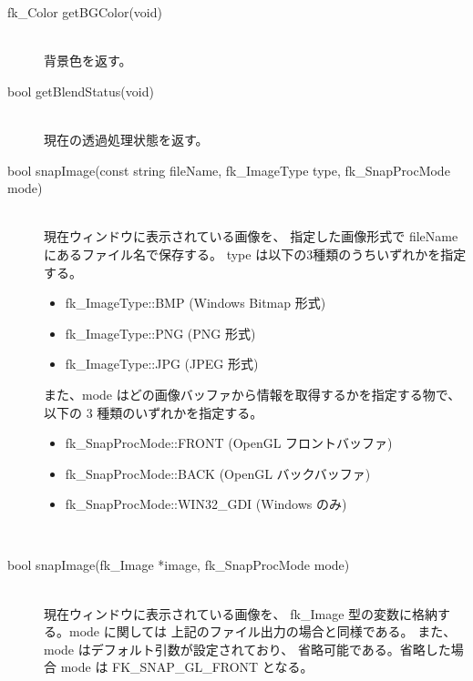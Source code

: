 \begin{description}
 \item[\hspace*{0.6cm}fk\_Color getBGColor(void)] ~ \\
	背景色を返す。\\

 \item[\hspace*{0.6cm}bool getBlendStatus(void)] ~ \\
	現在の透過処理状態を返す。\\

%
 \item[\hspace*{0.6cm}bool snapImage(const string fileName,
			fk\_ImageType type,
			fk\_SnapProcMode mode)] ~ \\
	現在ウィンドウに表示されている画像を、
	指定した画像形式で fileName にあるファイル名で保存する。
	type は以下の3種類のうちいずれかを指定する。
	\begin{itemize}
	 \item fk\_ImageType::BMP (Windows Bitmap 形式)
	 \item fk\_ImageType::PNG (PNG 形式)
	 \item fk\_ImageType::JPG (JPEG 形式)
	\end{itemize}
	また、mode はどの画像バッファから情報を取得するかを指定する物で、
	以下の 3 種類のいずれかを指定する。
	\begin{itemize}
	\item fk\_SnapProcMode::FRONT (OpenGL フロントバッファ)
	\item fk\_SnapProcMode::BACK (OpenGL バックバッファ)
	\item fk\_SnapProcMode::WIN32\_GDI (Windows のみ)
	\end{itemize} ~

 \item[\hspace*{0.6cm}bool snapImage(fk\_Image *image,
				fk\_SnapProcMode mode)] ~ \\
	現在ウィンドウに表示されている画像を、
	fk\_Image 型の変数に格納する。mode に関しては
	上記のファイル出力の場合と同様である。
	また、mode はデフォルト引数が設定されており、
	省略可能である。省略した場合 mode は FK\_SNAP\_GL\_FRONT となる。


\end{description}
